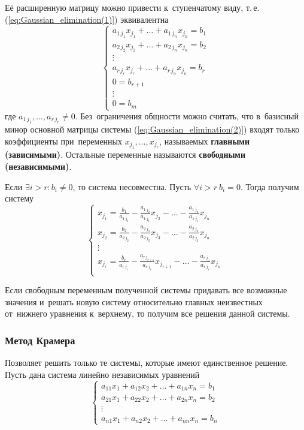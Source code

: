 Её расширенную матрицу можно привести к~ступенчатому виду, т.\,е. (\ref{eq:Gaussian_elimination(1)}) эквивалентна
\begin{equation}
\label{eq:Gaussian_elimination(2)}
\begin{cases}
a_{1\, j_1} x_{j_1} + \ldots + a_{1\, j_n} x_{j_n} = b_1 \\
a_{2\, j_2} x_{j_2} + \ldots + a_{2\, j_n} x_{j_n} = b_2 \\
\vdots \\
a_{r\, j_r} x_{j_r} + \ldots + a_{r\, j_n} x_{j_n} = b_r \\
0 = b_{r+1} \\
\vdots \\
0 = b_m
\end{cases}
\end{equation}
где $a_{1\, j_1}, \ldots, a_{r\, j_r} \neq 0$.
Без~ограничения общности можно считать, что в~базисный минор основной матрицы системы (\ref{eq:Gaussian_elimination(2)}) входят только коэффициенты при~переменных $x_{j_1}, \ldots, x_{j_r}$, называемых \textbf{главными (зависимыми)}.
Остальные переменные называются \textbf{свободными (независимыми)}.

Если $\exists i > r \colon b_i \neq 0$, то система несовместна.
Пусть $\forall i > r \ b_i = 0$. Тогда получим систему
\begin{equation*}
\begin{cases}
\displaystyle x_{j_1} = \frac{b_1}{a_{1\, j_1}} - \frac{a_{1\, j_2}}{a_{1\, j_1}} x_{j_2} - \ldots - \frac{a_{1\, j_n}}{a_{1\, j_1}} x_{j_n} \\
\displaystyle x_{j_2} = \frac{b_2}{a_{2\, j_2}} - \frac{a_{2\, j_3}}{a_{2\, j_2}} x_{j_3} - \ldots - \frac{a_{2\, j_n}}{a_{2\, j_2}} x_{j_n} \\
\vdots \\
\displaystyle x_{j_r} = \frac{b_r}{a_{r\, j_r}} - \frac{a_{r\, j_{r+1}}}{a_{r\, j_r}} x_{j_{r+1}} - \ldots - \frac{a_{r\, j_n}}{a_{r\, j_r}} x_{j_n} \\
\end{cases}
\end{equation*}

Если свободным переменным полученной системы придавать все возможные значения и~решать новую систему относительно главных неизвестных от~нижнего уравнения к~верхнему, то получим все решения данной системы.

\subsubsection{Метод Крамера}
Позволяет решить только те системы, которые имеют единственное решение. Пусть дана система линейно независимых уравнений
\begin{equation*}
\begin{cases}
a_{11}x_1 + a_{12}x_2 + \dots + a_{1n}x_n = b_1 \\
a_{21}x_1 + a_{22}x_2 + \dots + a_{2n}x_n = b_2 \\
\vdots \\
a_{n1}x_1 + a_{n2}x_2 + \dots + a_{nn}x_n = b_n
\end{cases}
\end{equation*}

